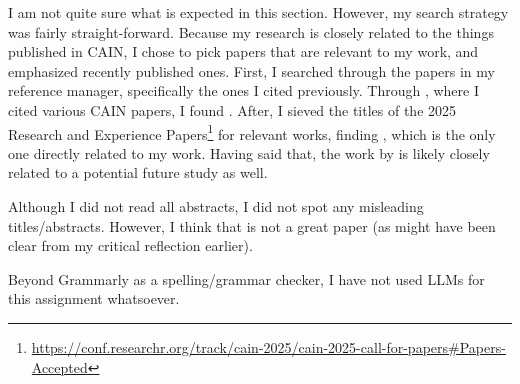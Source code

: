     I am not quite sure what is expected in this section.
    However, my search strategy was fairly straight-forward.
    Because my research is closely related to the things published in CAIN, I chose to pick papers that are relevant to my work, and emphasized recently published ones.
    First, I searched through the papers in my reference manager, specifically the ones I cited previously.
    Through \citet{meijer_contract_2024}, where I cited various CAIN papers, I found \citet{recupito2024unmasking}.
    After, I sieved the titles of the 2025 Research and Experience Papers\footnote{\href{https://conf.researchr.org/track/cain-2025/cain-2025-call-for-papers\#Papers-Accepted}{https://conf.researchr.org/track/cain-2025/cain-2025-call-for-papers\#Papers-Accepted}} for relevant works, finding \citet{shivashankar2025mlscent}, which is the only one directly related to my work.
    Having said that, the work by \citet{vonderhaar2025generating} is likely closely related to a potential future study as well.
    
    Although I did not read all abstracts, I did not spot any misleading titles/abstracts.
    However, I think that \citet{shivashankar2025mlscent} is not a great paper (as might have been clear from my critical reflection earlier).
    
    Beyond Grammarly as a spelling/grammar checker, I have not used LLMs for this assignment whatsoever.




    

